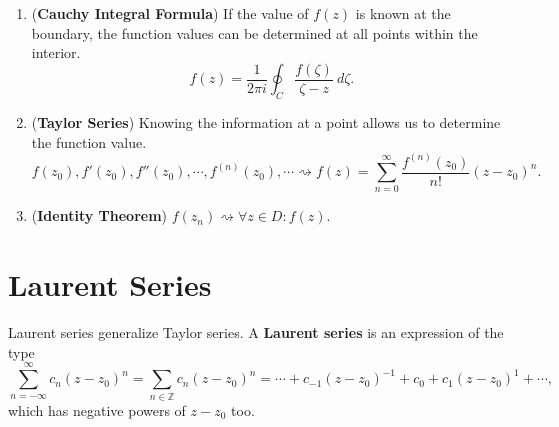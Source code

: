 \documentclass[12pt,openany]{book}
\theoremstyle{definition}
\newcommand{\Z}{\mathbb{Z}}
\begin{document}
	\begin{tcolorbox}[colback=white,colframe=magenta,arc=5pt,title={\color{white}\bf Summary}]
		\begin{enumerate}[(1)]
			\item (\textbf{Cauchy Integral Formula}) If the value of $f(z)$ is known at the boundary, the function values can be determined at all points within the interior. \[
			f(z)=\frac{1}{2\pi i}\oint_C\frac{f(\zeta)}{\zeta-z}\ d\zeta.
			\]\begin{center}
			\end{center}
			\item (\textbf{Taylor Series}) Knowing the information at a point allows us to determine the function value. \[
			f(z_0),f'(z_0),f''(z_0),\cdots,f^{(n)}(z_0),\cdots\rightsquigarrow f(z)=\sum_{n=0}^\infty\frac{f^{(n)}(z_0)}{n!}(z-z_0)^n.
			\]
			\item (\textbf{Identity Theorem}) $f(z_n)\rightsquigarrow \forall z\in D:f(z)$.
		\end{enumerate}
	\end{tcolorbox}
	
	\newpage
	\section{Laurent Series}
	
	Laurent series generalize Taylor series. A \textbf{Laurent series} is an expression of the type \[
	\sum_{n=-\infty}^\infty c_n(z-z_0)^n=\sum_{n\in\Z}c_n(z-z_0)^n=\cdots+c_{-1}(z-z_0)^{-1}+c_0+c_1(z-z_0)^1+\cdots,
	\] which has negative powers of $z-z_0$ too.
	
\end{document}
